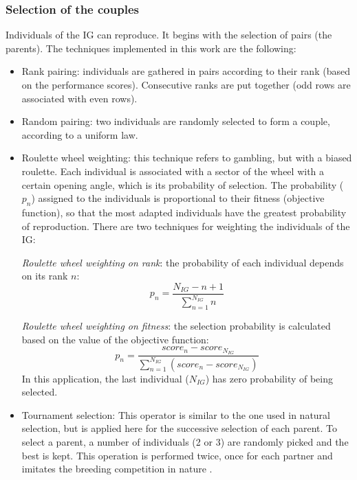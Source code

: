 \documentclass{ametsoc}
\begin{document}
\subsubsection{Selection of the couples}

Individuals of the IG can reproduce. It begins with the selection of pairs (the parents). The techniques implemented in this work are the following:


\begin{itemize}
	\item Rank pairing: individuals are gathered in pairs according to their rank (based on the performance scores). Consecutive ranks are put together (odd rows are associated with even rows).
	
	\item Random pairing: two individuals are randomly selected to form a couple, according to a uniform law.
	
	\item Roulette wheel weighting: this technique refers to gambling, but with a biased roulette. Each individual is associated with a sector of the wheel with a certain opening angle, which is its probability of selection. The probability ($p_{n}$) assigned to the individuals is proportional to their fitness (objective function), so that the most adapted individuals have the greatest probability of reproduction. There are two techniques for weighting the individuals of the IG:
	
	\textit{Roulette wheel weighting on rank}: the probability of each individual depends on its rank $n$:
	\begin{equation}
	p_{n}=\dfrac{N_{IG}-n+1}{\sum^{N_{IG}}_{n=1}n}
	\label{equation_mating_rank_weighting}
	\end{equation}
	
	\textit{Roulette wheel weighting on fitness}: the selection probability is calculated based on the value of the objective function:
	\begin{equation}
	p_{n}=\frac{score_{n}-score_{N_{IG}}}{\sum_{n=1}^{N_{IG}} (score_{n}-score_{N_{IG}})}
	\label{equation_mating_score_weighting}
	\end{equation}
	In this application, the last individual ($N_{IG}$) has zero probability of being selected.
	
	
	\item Tournament selection: This operator is similar to the one used in natural selection, but is applied here for the successive selection of each parent. To select a parent, a number of individuals (2 or 3) are randomly picked and the best is kept. This operation is performed twice, once for each partner and imitates the breeding competition in nature \citep{Haupt2004}.
\end{itemize}
\end{document}
